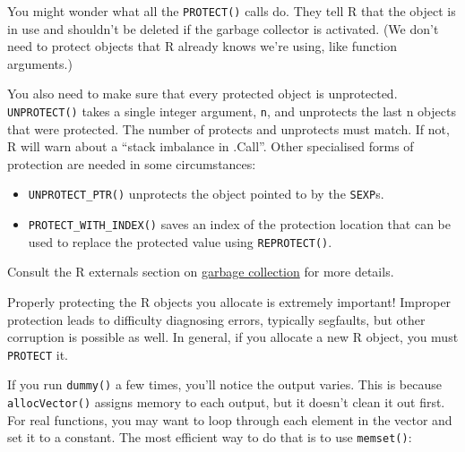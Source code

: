 You might wonder what all the \texttt{PROTECT()} calls do. They tell R
that the object is in use and shouldn't be deleted if the garbage
collector is activated. (We don't need to protect objects that R already
knows we're using, like function arguments.)

You also need to make sure that every protected object is unprotected.
\texttt{UNPROTECT()} takes a single integer argument, \texttt{n}, and
unprotects the last n objects that were protected. The number of
protects and unprotects must match. If not, R will warn about a ``stack
imbalance in .Call''. Other specialised forms of protection are needed
in some circumstances:

\begin{itemize}
\item
  \texttt{UNPROTECT\_PTR()} unprotects the object pointed to by the
  \texttt{SEXP}s.
\item
  \texttt{PROTECT\_WITH\_INDEX()} saves an index of the protection
  location that can be used to replace the protected value using
  \texttt{REPROTECT()}.
\end{itemize}

Consult the R externals section on
\href{http://cran.r-project.org/doc/manuals/R-exts.html\#Garbage-Collection}{garbage
collection} for more details.

Properly protecting the R objects you allocate is extremely important!
Improper protection leads to difficulty diagnosing errors, typically
segfaults, but other corruption is possible as well. In general, if you
allocate a new R object, you must \texttt{PROTECT} it.

If you run \texttt{dummy()} a few times, you'll notice the output
varies. This is because \texttt{allocVector()} assigns memory to each
output, but it doesn't clean it out first. For real functions, you may
want to loop through each element in the vector and set it to a
constant. The most efficient way to do that is to use \texttt{memset()}:

\begin{Shaded}
\begin{Highlighting}[]
\StringTok{ }\NormalTok{(}\NormalTok{(} \NormalTok{), }


\NormalTok{)}
\NormalTok{(}\NormalTok{);}
\end{Highlighting}
\end{Shaded}

